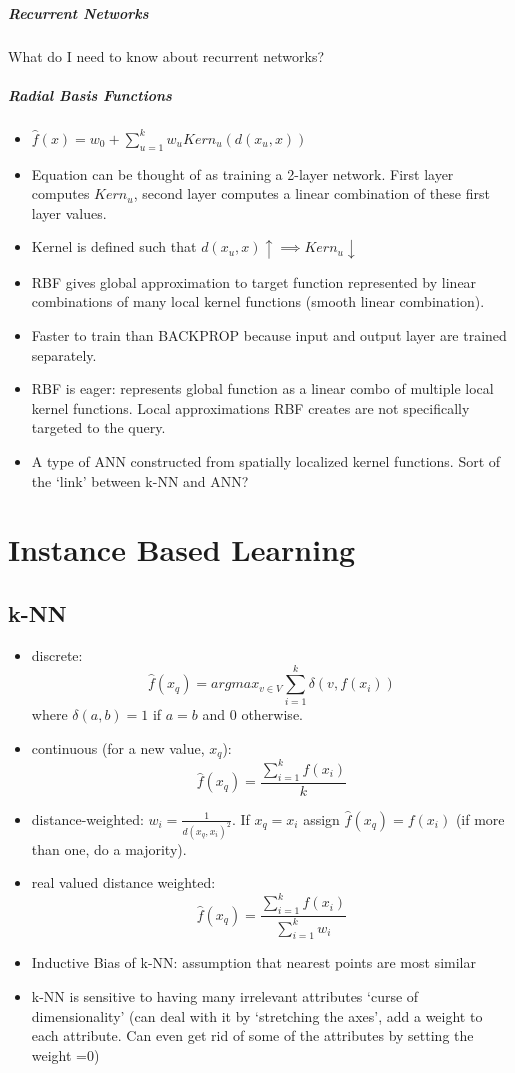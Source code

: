 \documentclass[11pt]{article}
\begin{document}
\subparagraph{Recurrent Networks}
What do I need to know about recurrent networks?

\subparagraph{Radial Basis Functions}
\begin{itemize}
\item $\hat{f}(x) = w_0+ \sum_{u=1}^k{w_uKern_u(d(x_u, x))}$
\item Equation can be thought of as training a 2-layer network. First layer computes $Kern_u$, second layer computes a linear combination of these first layer values.
\item Kernel is defined such that $d(x_u, x) \uparrow \implies Kern_u \downarrow$
\item RBF gives global approximation to target function represented by linear combinations of many local kernel functions (smooth linear combination).
\item Faster to train than \textsc{BACKPROP} because input and output layer are trained separately.
\item RBF is eager: represents global function as a linear combo of multiple local kernel functions. Local approximations RBF creates are not specifically targeted to the query.
\item A type of ANN constructed from spatially localized kernel functions. Sort of the `link' between k-NN and ANN?
\end{itemize}


\section{Instance Based Learning}
\subsection{k-NN}
\begin{itemize}
\item discrete: $$\hat{f} (x_q) =argmax_{v \in V} \sum_{i=1}^k{\delta(v, f(x_i))}$$ where $\delta(a,b) =1$ if $a=b$ and $0$ otherwise.
\item continuous (for a new value, $x_q$): $$\hat{f} (x_q) = \frac{\sum_{i=1}^{k}{f(x_i)}}{k}$$
\item distance-weighted: $w_i = \frac{1}{d(x_q, x_i)^2}$. If $x_q = x_i$ assign $\hat{f} (x_q) = f(x_i)$ (if more than one, do a majority).
\item real valued distance weighted: $$\hat{f} (x_q) = \frac{\sum_{i=1}^{k}{f(x_i)}}{\sum_{i=1}^{k}{w_i}}$$
\item  Inductive Bias of k-NN: assumption that nearest points are most similar
\item k-NN is sensitive to having many irrelevant attributes `curse of dimensionality' (can deal with it by `stretching the axes', add a weight to each attribute. Can even get rid of some of the attributes by setting the weight =0)
\end{itemize}
\end{document}
